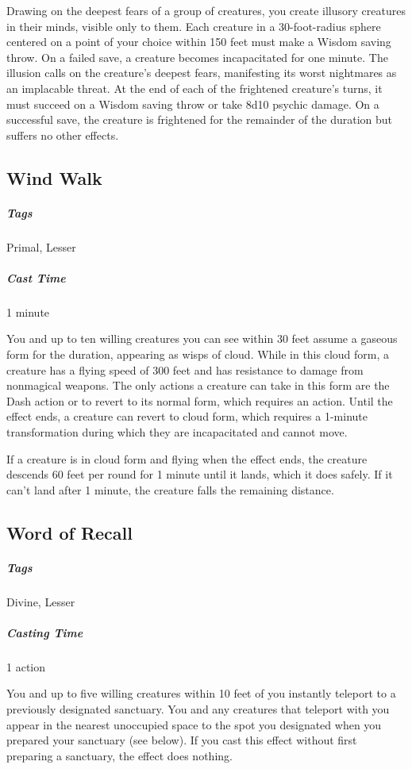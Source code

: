 Drawing on the deepest fears of a group of creatures, you create illusory creatures in their minds, visible only to them. Each creature in a 30-foot-radius sphere centered on a point of your choice within 150 feet must make a Wisdom saving throw. On a failed save, a creature becomes incapacitated for one minute. The illusion calls on the creature's deepest fears, manifesting its worst nightmares as an implacable threat. At the end of each of the frightened creature's turns, it must succeed on a Wisdom saving throw or take 8d10 psychic damage. On a successful save, the creature is frightened for the remainder of the duration but suffers no other effects.

\subsection{Wind Walk}\label{spell:wind-walk}
\subparagraph*{Tags} Primal, Lesser
\subparagraph*{Cast Time} 1 minute

You and up to ten willing creatures you can see within 30 feet assume a gaseous form for the duration, appearing as wisps of cloud. While in this cloud form, a creature has a flying speed of 300 feet and has resistance to damage from nonmagical weapons. The only actions a creature can take in this form are the Dash action or to revert to its normal form, which requires an action. Until the effect ends, a creature can revert to cloud form, which requires a 1-minute transformation during which they are incapacitated and cannot move.

If a creature is in cloud form and flying when the effect ends, the creature descends 60 feet per round for 1 minute until it lands, which it does safely. If it can't land after 1 minute, the creature falls the remaining distance.

\subsection{Word of Recall}\label{spell:word-of-recall}
\subparagraph*{Tags} Divine, Lesser
\subparagraph*{Casting Time} 1 action

You and up to five willing creatures within 10 feet of you instantly teleport to a previously designated sanctuary. You and any creatures that teleport with you appear in the nearest unoccupied space to the spot you designated when you prepared your sanctuary (see below). If you cast this effect without first preparing a sanctuary, the effect does nothing.


